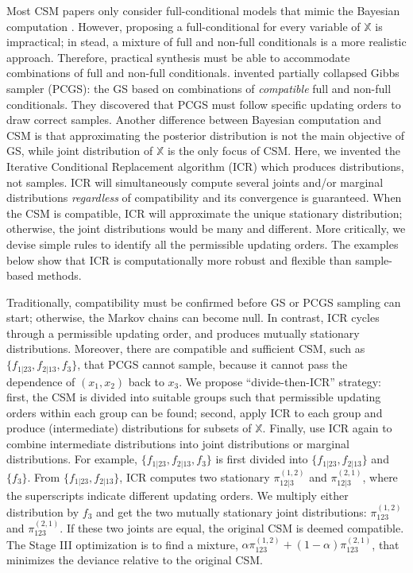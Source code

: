 \documentclass[12pt,a4paper]{article}
\begin{document}
Most CSM papers only consider full-conditional models that mimic  the Bayesian computation \citep{Smith1993}.  However, proposing a full-conditional for every variable of $\mathbb{X}$ is impractical; %
in stead, a mixture of full and non-full conditionals is  a more realistic approach.   Therefore, practical  synthesis must
be able to accommodate combinations of full and non-full conditionals.
\citet{vanDyk2008} invented partially collapsed Gibbs sampler (PCGS): the GS based on combinations of \emph{compatible} full and non-full conditionals.
They discovered that PCGS must follow specific updating orders to draw correct samples.
Another difference between Bayesian computation and CSM is that  approximating the posterior distribution  is not the main objective of GS,  while joint distribution of $\mathbb{X}$ is the only focus of CSM.  Here, we invented the Iterative Conditional Replacement algorithm (ICR) which produces distributions, not samples.  ICR will simultaneously compute several joints and/or marginal distributions
\emph{regardless} of  compatibility and its convergence is guaranteed.
When the CSM is compatible, ICR will approximate the unique stationary distribution; otherwise, the joint distributions would be many and different.  More critically, we devise simple rules to identify all the permissible updating orders.%
The examples below show that ICR is computationally more robust and flexible than sample-based methods.

Traditionally, compatibility must be confirmed before GS or PCGS sampling can start; otherwise, the Markov chains can become null.
In contrast, ICR  cycles through a permissible updating order, and produces mutually stationary  distributions.
Moreover, there are compatible and sufficient CSM, such as $\{ f_{1|23}, f_{2|13}, f_3\}$, that PCGS cannot sample, because it cannot pass the dependence of $(x_1,x_2)$ back to $x_3$. We propose ``divide-then-ICR'' strategy: first, the CSM is divided into suitable groups such that permissible updating orders within each group can be found;  second, apply ICR to each group and produce  (intermediate) distributions for subsets of $\mathbb{X}$. Finally, use ICR again to combine intermediate distributions into joint distributions or marginal distributions.  For example,  $\{ f_{1|23} ,f_{2|13}, f_3\}$ is first divided into $\{ f_{1|23}, f_{2|13} \}$ and $\{ f_3\}$.  From  $\{ f_{1|23}, f_{2|13} \}$, ICR computes  two stationary $\pi_{12|3}^{(1,2)}$ and $\pi_{12|3}^{(2,1)}$, where the superscripts indicate different updating orders. We multiply either distribution by $f_3$ and get the two mutually stationary joint distributions: $\pi_{123}^{(1,2)}$ and  $\pi_{123}^{(2,1)}$.  If these two joints are equal, the original CSM is deemed compatible.  The {\sf Stage III} optimization is to find a mixture, $\alpha\pi_{123}^{(1,2)}+ (1-\alpha)\pi_{123}^{(2,1)}$, that minimizes the deviance relative to the original CSM.
\end{document}
